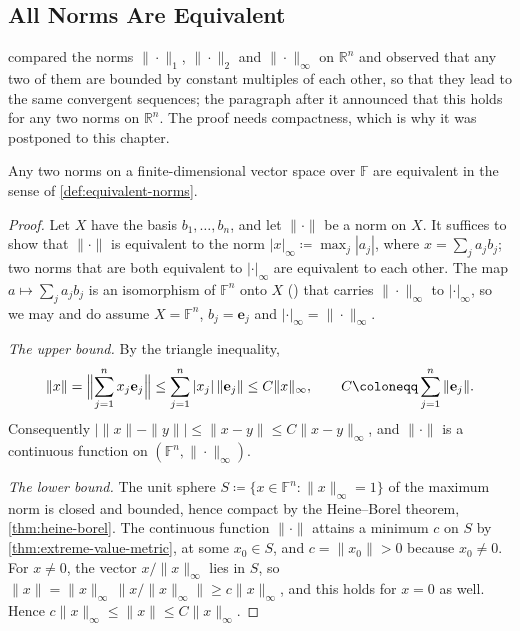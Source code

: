 \subsection{All Norms Are Equivalent}

 compared the norms $\|\cdot\|_1$, $\|\cdot\|_2$ and $\|\cdot\|_\infty$ on $\mathbb R^n$ and observed that any two of them are bounded by constant multiples of each other, so that they lead to the same convergent sequences; the paragraph after it announced that this holds for any two norms on $\mathbb R^n$. The proof needs compactness, which is why it was postponed to this chapter.

\begin{theorem}
\label{thm:norms-equivalent}
Any two norms on a finite-dimensional vector space over $\mathbb F$ are equivalent in the sense of \cref{def:equivalent-norms}.
\end{theorem}

\begin{proof}
Let $X$ have the basis $b_1,\ldots,b_n$, and let $\|\cdot\|$ be a norm on $X$. It suffices to show that $\|\cdot\|$ is equivalent to the norm $|x|_\infty\coloneqq\max_j|a_j|$, where $x=\sum_ja_jb_j$; two norms that are both equivalent to $|\cdot|_\infty$ are equivalent to each other. The map $a\mapsto\sum_ja_jb_j$ is an isomorphism of $\mathbb F^n$ onto $X$ () that carries $\|\cdot\|_\infty$ to $|\cdot|_\infty$, so we may and do assume $X=\mathbb F^n$, $b_j=\mathbf e_j$ and $|\cdot|_\infty=\|\cdot\|_\infty$.

\emph{The upper bound.} By the triangle inequality,
\[
\|x\|=\Bigl\|\sum_{j=1}^nx_j\mathbf e_j\Bigr\|\le\sum_{j=1}^n|x_j|\,\|\mathbf e_j\|\le C\|x\|_\infty,\qquad C\coloneqq\sum_{j=1}^n\|\mathbf e_j\| .
\]
Consequently $\bigl|\|x\|-\|y\|\bigr|\le\|x-y\|\le C\|x-y\|_\infty$, and $\|\cdot\|$ is a continuous function on $(\mathbb F^n,\|\cdot\|_\infty)$.

\emph{The lower bound.} The unit sphere $S\coloneqq\{x\in\mathbb F^n: \|x\|_\infty=1\}$ of the maximum norm is closed and bounded, hence compact by the Heine--Borel theorem, \cref{thm:heine-borel}. The continuous function $\|\cdot\|$ attains a minimum $c$ on $S$ by \cref{thm:extreme-value-metric}, at some $x_0\in S$, and $c=\|x_0\|>0$ because $x_0\ne0$. For $x\ne0$, the vector $x/\|x\|_\infty$ lies in $S$, so $\|x\|=\|x\|_\infty\,\|x/\|x\|_\infty\|\ge c\|x\|_\infty$, and this holds for $x=0$ as well. Hence $c\|x\|_\infty\le\|x\|\le C\|x\|_\infty$.
\end{proof}

